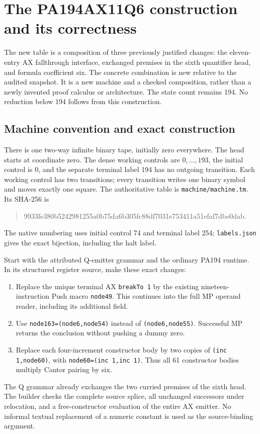 \section{The PA194AX11Q6 construction and its correctness}
\label{sec:ax11q6}

The new table is a composition of three previously justified changes: the
eleven-entry AX fallthrough interface, exchanged premises in the sixth
quantifier head, and formula coefficient six. The concrete combination is
new relative to the audited snapshot. It is a new machine and a checked
composition, rather than a newly invented proof calculus or architecture.
The state count remains 194. No reduction below 194 follows from this
construction.

\subsection{Machine convention and exact construction}

There is one two-way infinite binary tape, initially zero everywhere. The
head starts at coordinate zero. The dense working controls are
$0,\ldots,193$, the initial control is 0, and the separate terminal label
194 has no outgoing transition. Each working control has two transitions;
every transition writes one binary symbol and moves exactly one square.
The authoritative table is \texttt{machine/machine.tm}. Its SHA-256 is
\begin{quote}\ttfamily\small
9933fe380b5242981255a0b75da6b305fc88df7031e753411a51efaf7dbe0dab.
\end{quote}
The native numbering uses initial control 74 and terminal label 254;
\texttt{labels.json} gives the exact bijection, including the halt label.

Start with the attributed Q-emitter grammar and the ordinary PA194 runtime.
In its structured register source, make these exact changes:
\begin{enumerate}
\item Replace the unique terminal AX \texttt{breakTo 1} by the existing
      nineteen-instruction Push macro \texttt{node49}. This continues into
      the full MP operand reader, including its additional field.
\item Use \texttt{node163=(node6,node54)} instead of
      \texttt{(node6,node55)}. Successful MP returns the conclusion without
      pushing a dummy zero.
\item Replace each four-increment constructor body by two copies of
      \texttt{(inc 1,node60)}, with \texttt{node60=(inc 1,inc 1)}.
      Thus all 61 constructor bodies multiply Cantor pairing by six.
\end{enumerate}
The Q grammar already exchanges the two curried premises of the sixth
head. The builder checks the complete source splice, all unchanged
successors under relocation, and a free-constructor evaluation of the
entire AX emitter. No informal textual replacement of a numeric constant
is used as the source-binding argument.

